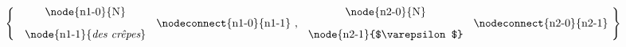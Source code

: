 



\centering
$\left \{
\mbox{
\begin{tabular}{c}
\node{n1-0}{N} \\[2ex]
\node{n1-1}{{\it des cr\^{e}pes}}
\end{tabular} %
\nodeconnect{n1-0}{n1-1}
, %
\begin{tabular}{c}
\node{n2-0}{N} \\[2ex]
\node{n2-1}{$\varepsilon$}
\end{tabular} %
\nodeconnect{n2-0}{n2-1}
}
\right \}$

